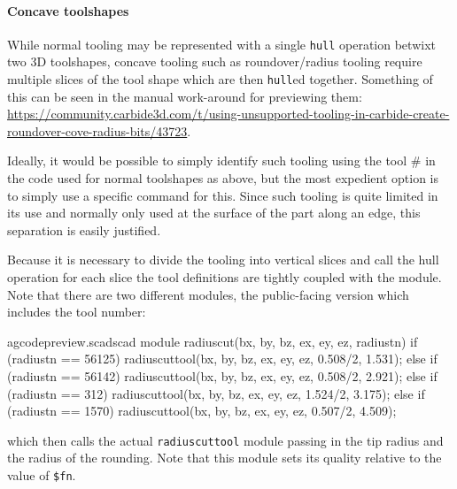 \documentclass{ltxdoc}
\begin{document}
\paragraph{Concave toolshapes}
\label{para:concavetoolshapes} 
While normal tooling may be represented with a single \texttt{hull} operation betwixt two
3D toolshapes, concave tooling such as roundover/radius tooling require multiple slices
of the tool shape which are then \texttt{hull}ed together. Something of this can be seen
in the manual work-around for previewing them: 
\url{https://community.carbide3d.com/t/using-unsupported-tooling-in-carbide-create-roundover-cove-radius-bits/43723}.

Ideally, it would be possible to simply identify such tooling using the tool \# in the
code used for normal toolshapes as above, but the most expedient option is to simply
use a specific command for this. Since such tooling is quite limited in its use and 
normally only used at the surface of the part along an edge, this separation is 
easily justified.

Because it is necessary to divide the tooling into vertical slices and call the hull operation 
for each slice the tool definitions are tightly coupled with the module. Note that there are 
two different modules, the public-facing version which includes the tool number:
 
\lstset{firstnumber=\thegcpscad}
\begin{writecode}{a}{gcodepreview.scad}{scad}
module radiuscut(bx, by, bz, ex, ey, ez, radiustn) {
    if (radiustn == 56125) {
        radiuscuttool(bx, by, bz, ex, ey, ez, 0.508/2, 1.531);
    } else if (radiustn == 56142) {
        radiuscuttool(bx, by, bz, ex, ey, ez, 0.508/2, 2.921);
    } else if (radiustn == 312) {
        radiuscuttool(bx, by, bz, ex, ey, ez, 1.524/2, 3.175);
    } else if (radiustn == 1570) {
        radiuscuttool(bx, by, bz, ex, ey, ez, 0.507/2, 4.509);
    }
}

\end{writecode}
\addtocounter{gcpscad}{12}

\noindent which then calls the actual \texttt{radiuscuttool} module  
passing in the tip radius and the radius of the rounding. Note that this
module sets its quality relative to the value of \verb|$fn|.
\end{document}
